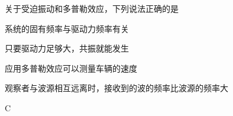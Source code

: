 关于受迫振动和多普勒效应，下列说法正确的是\paren[C]
\begin{choices}
	\item 系统的固有频率与驱动力频率有关
	\item 只要驱动力足够大，共振就能发生
	\item 应用多普勒效应可以测量车辆的速度
	\item 观察者与波源相互远离时，接收到的波的频率比波源的频率大
\end{choices}
\begin{answer}
	C
\end{answer}